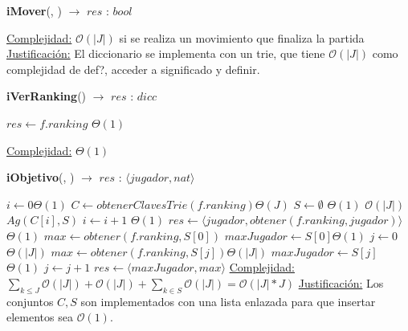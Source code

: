 \documentclass[10pt, a4paper]{article}
\newcommand{\bigO}{\mathcal{O}}
\begin{document}
\begin{Algoritmos}
\begin{algorithm}[H]{\textbf{iMover}(, ) $\to$ $res$ : $bool$}
\begin{algorithmic}[1]
			\medskip
			\Statex \underline{Complejidad:} $\bigO(|J|)$ si se realiza un movimiento que finaliza la partida
			\Statex \underline{Justificación:} El diccionario se implementa con un trie, que tiene $\bigO(|J|)$ como complejidad de def?, acceder a significado y definir.
    	\end{algorithmic}
\end{algorithm}
	

\begin{algorithm}[H]{\textbf{iVerRanking}() $\to$ $res$ : $dicc$}
	\begin{algorithmic}[1]
			 \State $res \gets f.ranking$	 \Comment $\Theta(1)$
    
			\medskip
			\Statex \underline{Complejidad:} $\Theta(1)$
    	\end{algorithmic}
\end{algorithm}	


\begin{algorithm}[H]{\textbf{iObjetivo}(, ) $\to$ $res$ : $\langle jugador, nat\rangle$}
	\begin{algorithmic}[1]

			 
			 \State $i \gets 0$\Comment $\Theta(1)$
			 \State $C \gets obtenerClavesTrie(f.ranking)$\Comment $\Theta(J)$
			 \State $S \gets \emptyset$ \Comment $\Theta(1)$
			 			\Comment $\bigO(|J|)$
			 	\State $Ag(C[i], S)$ 
			 	\EndIf
				\State $i \gets i + 1$		\Comment $\Theta(1)$
			 \EndWhile
			 \State $res \gets \langle jugador, obtener(f.ranking, jugador)\rangle$	\Comment $\Theta(1)$
			 \Else
			 \State $max \gets obtener(f.ranking, S[0])$ \Comment{$\bigO(|J|)$}
			 \State $maxJugador \gets S[0]$\Comment $\Theta(1)$
			 \State $j \gets 0$
			 \Comment $\Theta(|J|)$
			 \State $max\gets obtener(f.ranking, S[j])$\Comment $\Theta(|J|)$
			 \State $maxJugador\gets S[j]$\Comment $\Theta(1)$
			 \EndIf
			 \State $j\gets j+1$
			 \EndWhile
			 \State $res \gets \langle maxJugador, max\rangle$
			 \EndIf
			\medskip
			\Statex \underline{Complejidad:} $\sum_{k\leq J}\bigO(|J|)+\bigO(|J|)+\sum_{k\in S}\bigO(|J|)=\bigO(|J|*J)$
			\Statex \underline{Justificación:} Los conjuntos $C,S$ son implementados con una lista enlazada para que insertar elementos sea $\bigO(1)$.
    	\end{algorithmic}
\end{algorithm}	


\end{Algoritmos}
\end{document}
